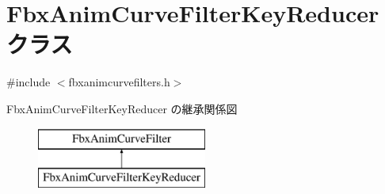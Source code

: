 \hypertarget{class_fbx_anim_curve_filter_key_reducer}{}\section{Fbx\+Anim\+Curve\+Filter\+Key\+Reducer クラス}
\label{class_fbx_anim_curve_filter_key_reducer}


{\ttfamily \#include $<$fbxanimcurvefilters.\+h$>$}

Fbx\+Anim\+Curve\+Filter\+Key\+Reducer の継承関係図\begin{figure}[H]
\begin{center}
\leavevmode
\includegraphics[height=2.000000cm]{class_fbx_anim_curve_filter_key_reducer}
\end{center}
\end{figure}

